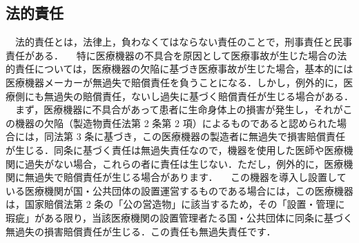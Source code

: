 \documentclass[uplatex,a4paper]{jsarticle}
\begin{document}
\subsection{法的責任}
　法的責任とは，法律上，負わなくてはならない責任のことで，刑事責任と民事責任がある．
　特に医療機器の不具合を原因として医療事故が生じた場合の法的責任については，医療機器の欠陥に基づき医療事故が生じた場合，基本的には医療機器メーカーが無過失で賠償責任を負うことになる．しかし，例外的に，医療側にも無過失の賠償責任，ないし過失に基づく賠償責任が生じる場合がある．
　まず，医療機器に不具合があって患者に生命身体上の損害が発生し，それがこの機器の欠陥（製造物責任法第 2 条第 2 項）によるものであると認められた場合には，同法第 3 条に基づき，この医療機器の製造者に無過失で損害賠償責任が生じる．同条に基づく責任は無過失責任なので，機器を使用した医師や医療機関に過失がない場合，これらの者に責任は生じない．ただし，例外的に，医療機関に無過失で賠償責任が生じる場合があります．
　この機器を導入し設置している医療機関が国・公共団体の設置運営するものである場合には，この医療機器は，国家賠償法第 2 条の「公の営造物」に該当するため，その「設置・管理に瑕疵」がある限り，当該医療機関の設置管理者たる国・公共団体に同条に基づく無過失の損害賠償責任が生じる．この責任も無過失責任です．
~\cite{qi2016volumetric}

%
%



\end{document}
